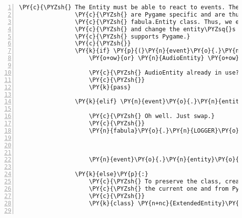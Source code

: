 \begin{Verbatim}[commandchars=\\\{\},numbers=left,firstnumber=1,stepnumber=1]
                \PY{c}{\PYZsh{} The Entity must be able to react to events. These reactions}
                \PY{c}{\PYZsh{} are Pygame specific and are thus not covered in the basic}
                \PY{c}{\PYZsh{} fabula.Entity class. Thus, we exploit a Python feature here}
                \PY{c}{\PYZsh{} and change the entity\PYZsq{}s class at runtime to a class that}
                \PY{c}{\PYZsh{} supports Pygame.}
                \PY{c}{\PYZsh{}}
                \PY{k}{if} \PY{p}{(}\PY{n}{event}\PY{o}{.}\PY{n}{entity}\PY{o}{.}\PY{n}{\PYZus{}\PYZus{}class\PYZus{}\PYZus{}} \PY{o+ow}{is} \PY{n}{AudioEntity}
                    \PY{o+ow}{or} \PY{n}{AudioEntity} \PY{o+ow}{in} \PY{n}{event}\PY{o}{.}\PY{n}{entity}\PY{o}{.}\PY{n}{\PYZus{}\PYZus{}class\PYZus{}\PYZus{}}\PY{o}{.}\PY{n}{\PYZus{}\PYZus{}bases\PYZus{}\PYZus{}}\PY{p}{)}\PY{p}{:}

                    \PY{c}{\PYZsh{} AudioEntity already in use? Great!}
                    \PY{c}{\PYZsh{}}
                    \PY{k}{pass}

                \PY{k}{elif} \PY{n}{event}\PY{o}{.}\PY{n}{entity}\PY{o}{.}\PY{n}{\PYZus{}\PYZus{}class\PYZus{}\PYZus{}} \PY{o+ow}{is} \PY{n}{fabula}\PY{o}{.}\PY{n}{Entity}\PY{p}{:}

                    \PY{c}{\PYZsh{} Oh well. Just swap.}
                    \PY{c}{\PYZsh{}}
                    \PY{n}{fabula}\PY{o}{.}\PY{n}{LOGGER}\PY{o}{.}\PY{n}{debug}\PY{p}{(}\PY{l+s}{\PYZdq{}}\PY{l+s}{changing class of }\PY{l+s}{\PYZsq{}}\PY{l+s}{\PYZob{}\PYZcb{}}\PY{l+s}{\PYZsq{}}\PY{l+s}{ from \PYZob{}\PYZcb{} to \PYZob{}\PYZcb{}}\PY{l+s}{\PYZdq{}}\PY{o}{.}\PY{n}{format}\PY{p}{(}\PY{n}{event}\PY{o}{.}\PY{n}{entity}\PY{o}{.}\PY{n}{identifier}\PY{p}{,}
                                                                                      \PY{n}{event}\PY{o}{.}\PY{n}{entity}\PY{o}{.}\PY{n}{\PYZus{}\PYZus{}class\PYZus{}\PYZus{}}\PY{p}{,}
                                                                                      \PY{n}{AudioEntity}\PY{p}{)}\PY{p}{)}

                    \PY{n}{event}\PY{o}{.}\PY{n}{entity}\PY{o}{.}\PY{n}{\PYZus{}\PYZus{}class\PYZus{}\PYZus{}} \PY{o}{=} \PY{n}{AudioEntity}

                \PY{k}{else}\PY{p}{:}
                    \PY{c}{\PYZsh{} To preserve the class, create a new class that inherits from}
                    \PY{c}{\PYZsh{} the current one and from PygameEntity.}
                    \PY{c}{\PYZsh{}}
                    \PY{k}{class} \PY{n+nc}{ExtendedEntity}\PY{p}{(}\PY{n}{event}\PY{o}{.}\PY{n}{entity}\PY{o}{.}\PY{n}{\PYZus{}\PYZus{}class\PYZus{}\PYZus{}}\PY{p}{,} \PY{n}{AudioEntity}\PY{p}{)}\PY{p}{:}


\end{Verbatim}
